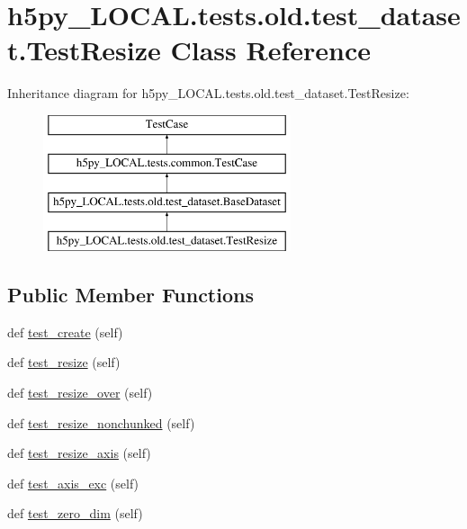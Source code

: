 \hypertarget{classh5py__LOCAL_1_1tests_1_1old_1_1test__dataset_1_1TestResize}{}\section{h5py\+\_\+\+L\+O\+C\+A\+L.\+tests.\+old.\+test\+\_\+dataset.\+Test\+Resize Class Reference}
\label{classh5py__LOCAL_1_1tests_1_1old_1_1test__dataset_1_1TestResize}
Inheritance diagram for h5py\+\_\+\+L\+O\+C\+A\+L.\+tests.\+old.\+test\+\_\+dataset.\+Test\+Resize\+:\begin{figure}[H]
\begin{center}
\leavevmode
\includegraphics[height=4.000000cm]{classh5py__LOCAL_1_1tests_1_1old_1_1test__dataset_1_1TestResize}
\end{center}
\end{figure}
\subsection*{Public Member Functions}
\begin{DoxyCompactItemize}
\item 
def \hyperlink{classh5py__LOCAL_1_1tests_1_1old_1_1test__dataset_1_1TestResize_a8a15dbcce15d3f3d2046b2e5b1001e6a}{test\+\_\+create} (self)
\item 
def \hyperlink{classh5py__LOCAL_1_1tests_1_1old_1_1test__dataset_1_1TestResize_a92e79f0f5580350b37f14fe888664efb}{test\+\_\+resize} (self)
\item 
def \hyperlink{classh5py__LOCAL_1_1tests_1_1old_1_1test__dataset_1_1TestResize_af6e9c00976766e7fd4a2504234352cb1}{test\+\_\+resize\+\_\+over} (self)
\item 
def \hyperlink{classh5py__LOCAL_1_1tests_1_1old_1_1test__dataset_1_1TestResize_a9943a4d9b2a50bf710b637f9096ba872}{test\+\_\+resize\+\_\+nonchunked} (self)
\item 
def \hyperlink{classh5py__LOCAL_1_1tests_1_1old_1_1test__dataset_1_1TestResize_a0c74d8c0ca3a5cd13761944495be07e1}{test\+\_\+resize\+\_\+axis} (self)
\item 
def \hyperlink{classh5py__LOCAL_1_1tests_1_1old_1_1test__dataset_1_1TestResize_a0911f7da216540e4876ebddaffdd0167}{test\+\_\+axis\+\_\+exc} (self)
\item 
def \hyperlink{classh5py__LOCAL_1_1tests_1_1old_1_1test__dataset_1_1TestResize_af082b3792ed3876ff69354f4e47b62d7}{test\+\_\+zero\+\_\+dim} (self)
\end{DoxyCompactItemize}
